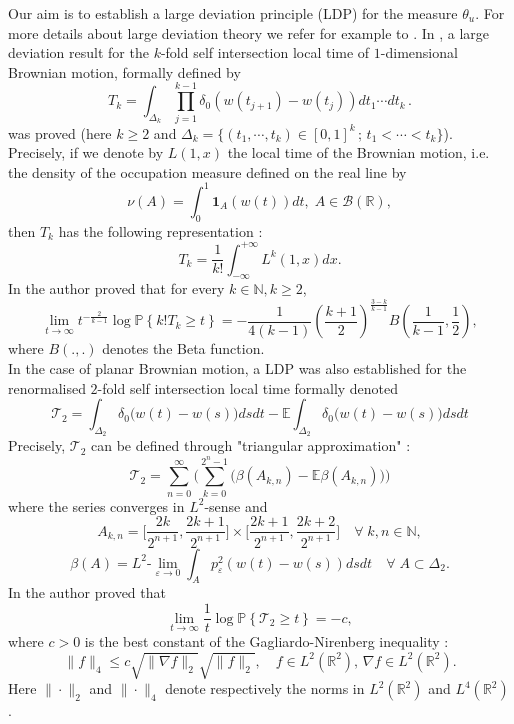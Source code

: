 \documentclass[]{interact}
\newcommand{\E}{{\mathbb{E}}}
\newcommand{\R}{{\mathbb{R}}}
\newcommand{\1}{\mathbf{1}}
\newcommand{\N}{{\mathbb N}}
\newcommand{\ve}{\varepsilon}
\newcommand{\PP}{{\mathbb{P}}}
\theoremstyle{plain}%
\theoremstyle{definition}
\theoremstyle{remark}
\begin{document}
\noindent Our aim is to establish a large deviation principle (LDP) for the measure $ \theta_u$. For more details about large deviation theory we refer for example to \cite{DZ09,Chen09}. In \cite{Chen09}, a large deviation result for the $k$-fold self intersection local time of $1$-dimensional Brownian motion, formally defined by  
\begin{equation}
\label{8645} T_k=\int _{\Delta_k} \prod _{j=1}^{k-1} \delta_{0}(w(t_{j+1})-w(t_j)) dt_1\cdots dt_k\,.
\end{equation}
was proved (here $k\geqslant2$ and $ \Delta_k= \{ (t_1,\cdots,t_k)\in [0,1]^k\, ;\, t_1<\cdots <t_k\} $). Precisely, if we denote by $L(1,x)$ the local time of the Brownian motion, i.e. the density of the occupation measure defined on the real line by 
$$ \nu (A)=\int_0^1 \mathbf{1}_A(w(t))dt, \; A \in \mathcal{B}(\R), $$
then $T_k$ has the following representation :
$$ T_k=\dfrac{1}{k!} \int_{-\infty}^{+\infty} L^k(1,x)dx.  $$
In \cite[Theorem 4.2.1.]{Chen09} the author proved that for every $k\in \N, k\geqslant2$,
$$ \lim _{t \to \infty } t^{-\frac{2}{k-1}} \log \PP \left\lbrace k! T_k \geqslant t \right\rbrace =-\dfrac{1}{4(k-1)} \left( \dfrac{k+1}{2} \right) ^{\frac{3-k}{k-1}} B\left( \dfrac{1}{k-1}, \dfrac{1}{2} \right),   $$
where $B(.,.)$ denotes the Beta function.\\

In the case of planar Brownian motion, a LDP was also established for the renormalised $2$-fold self intersection local time formally denoted
\begin{equation} \label{renormlised_planar}
\mathcal{T}_2=\int _{\Delta_2} \delta_0 \big(w(t)-w(s) \big)  dsdt-\E \int _{\Delta_2} \delta_0 \big(w(t)-w(s) \big)  dsdt
\end{equation}
Precisely, $\mathcal{T}_2$ can be defined through "triangular approximation" :
$$ \mathcal{T}_2=\sum_{n=0}^{\infty}\Big( \sum_{k=0}^{2^n-1} \big( \beta (A_{k,n})-\E \beta (A_{k,n})\big) \Big)$$
where the series converges in $L^2$-sense and 
$$ A_{k,n}=\Big[ \dfrac{2k}{2^{n+1}} ,  \dfrac{2k+1}{2^{n+1}} \Big]\times \Big[ \dfrac{2k+1}{2^{n+1}},\dfrac{2k+2}{2^{n+1}} \Big] \quad \forall \;k,n \in \N,$$
$$ \beta (A ) =L^2 \text{-}  \lim _{\ve \to 0} \int_{A} p_{\ve}^2(w(t)-w(s))ds dt \quad \forall \;A \subset \Delta_2. $$
In \cite[Theorem 4.3.1.]{Chen09} the author proved that 
$$ \lim _{t \to \infty } \dfrac{1}{t} \log \PP \left\lbrace \mathcal{T}_2 \geqslant t \right\rbrace =-c,   $$
where $c>0$ is the best constant of the Gagliardo-Nirenberg inequality :
$$ \|f\|_4\leqslant c \sqrt{\| \nabla f \|_2} \sqrt{\| f \|_2},\quad f\in L^2(\R^2),\, \nabla f \in L^2(\R^2). $$
Here $\|\cdot\|_2$ and $\|\cdot\|_4$ denote respectively the norms in $L^2(\R^2)$ and $L^4(\R^2)$.\\
\end{document}
